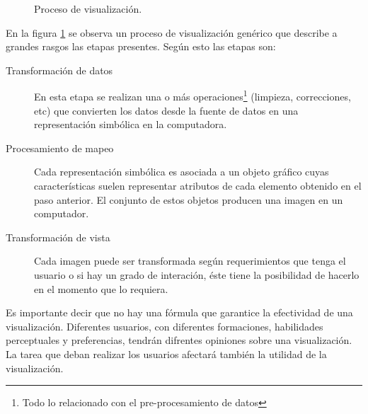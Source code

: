 \documentclass[12pt]{article}
\begin{document}
\begin{figure}[h] %
\caption{Proceso de visualización. }
\label{fig:proc_visualizacion}
\end{figure}

En la figura \ref{fig:proc_visualizacion} se observa un proceso de visualización genérico que describe a grandes rasgos las etapas presentes. Según esto las etapas son:

\begin{description}
	\item[Transformación de datos] En esta etapa se realizan una o más operaciones\footnote{Todo lo relacionado con el pre-procesamiento de datos} (limpieza, correcciones, etc) que convierten los datos desde la fuente de datos en una representación simbólica en la computadora. 
	
	\item[Procesamiento de mapeo] Cada representación simbólica es asociada a un objeto gráfico cuyas características suelen representar atributos de cada elemento obtenido en el paso anterior. El conjunto de estos objetos producen una imagen en un computador.
	
	\item[Transformación de vista] Cada imagen puede ser transformada según requerimientos que tenga el usuario o si hay un grado de interación, éste tiene la posibilidad de hacerlo en el momento que lo requiera.
	
\end{description}


Es importante decir que no hay una fórmula que garantice la efectividad de una visualización. Diferentes usuarios, con diferentes formaciones, habilidades perceptuales y preferencias, tendrán difrentes opiniones sobre una visualización. La tarea que deban realizar los usuarios afectará también la utilidad de la visualización.
\end{document}
